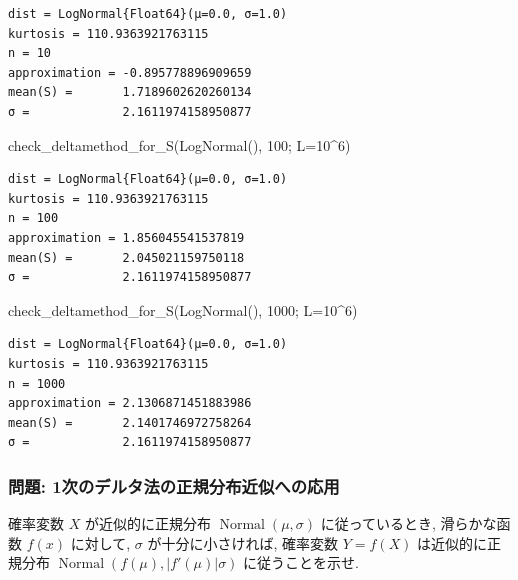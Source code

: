 \documentclass[
  letterpaper,
  DIV=11,
  numbers=noendperiod]{scrartcl}
\newenvironment{Shaded}{\begin{snugshade}}{\end{snugshade}}
\newcommand{\FloatTok}[1]{\textcolor[rgb]{0.68,0.00,0.00}{#1}}
\newcommand{\FunctionTok}[1]{\textcolor[rgb]{0.28,0.35,0.67}{#1}}
\newcommand{\NormalTok}[1]{\textcolor[rgb]{0.00,0.23,0.31}{#1}}
\newcommand{\OperatorTok}[1]{\textcolor[rgb]{0.37,0.37,0.37}{#1}}
\begin{document}
\begin{verbatim}
dist = LogNormal{Float64}(μ=0.0, σ=1.0)
kurtosis = 110.9363921763115
n = 10
approximation = -0.895778896909659
mean(S) =       1.7189602620260134
σ =             2.1611974158950877
\end{verbatim}

\begin{Shaded}
\begin{Highlighting}[]
\FunctionTok{check\_deltamethod\_for\_S}\NormalTok{(}\FunctionTok{LogNormal}\NormalTok{(), }\FloatTok{100}\NormalTok{; L}\OperatorTok{=}\FloatTok{10}\OperatorTok{\^{}}\FloatTok{6}\NormalTok{)}
\end{Highlighting}
\end{Shaded}

\begin{verbatim}
dist = LogNormal{Float64}(μ=0.0, σ=1.0)
kurtosis = 110.9363921763115
n = 100
approximation = 1.856045541537819
mean(S) =       2.045021159750118
σ =             2.1611974158950877
\end{verbatim}

\begin{Shaded}
\begin{Highlighting}[]
\FunctionTok{check\_deltamethod\_for\_S}\NormalTok{(}\FunctionTok{LogNormal}\NormalTok{(), }\FloatTok{1000}\NormalTok{; L}\OperatorTok{=}\FloatTok{10}\OperatorTok{\^{}}\FloatTok{6}\NormalTok{)}
\end{Highlighting}
\end{Shaded}

\begin{verbatim}
dist = LogNormal{Float64}(μ=0.0, σ=1.0)
kurtosis = 110.9363921763115
n = 1000
approximation = 2.1306871451883986
mean(S) =       2.1401746972758264
σ =             2.1611974158950877
\end{verbatim}

\hypertarget{ux554fux984c-1ux6b21ux306eux30c7ux30ebux30bfux6cd5ux306eux6b63ux898fux5206ux5e03ux8fd1ux4f3cux3078ux306eux5fdcux7528}{%
\subsubsection{問題:
1次のデルタ法の正規分布近似への応用}\label{ux554fux984c-1ux6b21ux306eux30c7ux30ebux30bfux6cd5ux306eux6b63ux898fux5206ux5e03ux8fd1ux4f3cux3078ux306eux5fdcux7528}}

確率変数 \(X\) が近似的に正規分布 \(\operatorname{Normal}(\mu,\sigma)\)
に従っているとき, 滑らかな函数 \(f(x)\) に対して, \(\sigma\)
が十分に小さければ, 確率変数 \(Y = f(X)\) は近似的に正規分布
\(\operatorname{Normal}(f(\mu), |f'(\mu)|\sigma)\) に従うことを示せ.
\end{document}
